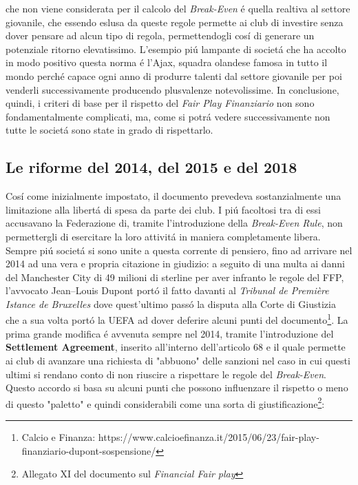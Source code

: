 \documentclass[
    corpo=12pt,
    oneside,
    evenboxes,
    tipotesi=triennale,
    stile=classica,
    oldstyle,
    autoretitolo,
    greek,
]{toptesi}
\begin{document}
\begin{interlinea}{1.5}
che non viene considerata per il calcolo del \emph{Break-Even} \'e quella realtiva al settore giovanile, che essendo eslusa da queste regole
permette ai club di investire senza dover pensare ad alcun tipo di regola, permettendogli cos\'i di generare un potenziale ritorno
elevatissimo. L'esempio pi\'u lampante di societ\'a che ha accolto in modo positivo questa norma \'e l'Ajax, squadra olandese famosa in 
tutto il mondo perch\'e capace ogni anno di produrre talenti dal settore giovanile per poi venderli successivamente
producendo plusvalenze notevolissime.\newline
In conclusione, quindi, i criteri di base per il rispetto del \emph{Fair Play Finanziario} non sono fondamentalmente complicati, ma, come 
si potr\'a vedere successivamente non tutte le societ\'a sono state in grado di rispettarlo.
\subsection{Le riforme del 2014, del 2015 e del 2018}
Cos\'i come inizialmente impostato, il documento prevedeva sostanzialmente una limitazione alla libert\'a di spesa da parte dei club. 
I pi\'u facoltosi tra di essi accusavano la Federazione di, tramite l'introduzione della \emph{Break-Even Rule}, non permettergli di 
esercitare la loro attivit\'a in maniera completamente libera. Sempre pi\'u societ\'a si sono unite a questa corrente di pensiero,
fino ad arrivare nel 2014 ad una vera e propria citazione in giudizio: a seguito di una multa ai danni del Manchester City di 49 milioni di sterline per aver infranto 
le regole del FFP, l'avvocato Jean–Louis Dupont port\'o il fatto davanti al \emph{Tribunal de Première Istance de Bruxelles} dove quest'ultimo pass\'o la disputa alla 
Corte di Giustizia che a sua volta port\'o la UEFA ad dover deferire alcuni punti del documento\footnote{Calcio e Finanza: https://www.calcioefinanza.it/2015/06/23/fair-play-finanziario-dupont-sospensione/}.\newline
La prima grande modifica \'e avvenuta sempre nel 2014, tramite l'introduzione del \textbf{Settlement Agreement}, inserito all'interno dell'articolo 68 e il quale permette
ai club di avanzare una richiesta di "abbuono" delle sanzioni nel caso in cui questi ultimi si rendano conto di non riuscire a rispettare le regole del 
\emph{Break-Even}. Questo accordo si basa su alcuni punti che possono influenzare il rispetto o meno di questo "paletto" e quindi considerabili
come una sorta di giustificazione\footnote{Allegato XI del documento sul \emph{Financial Fair play}}:

\end{interlinea}
\end{document}
